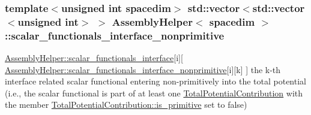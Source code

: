 \subsubsection[{\texorpdfstring{scalar\+\_\+functionals\+\_\+interface\+\_\+nonprimitive}{scalar_functionals_interface_nonprimitive}}]{\setlength{\rightskip}{0pt plus 5cm}template$<$unsigned int spacedim$>$ std\+::vector$<$std\+::vector$<$unsigned int$>$ $>$ {\bf Assembly\+Helper}$<$ spacedim $>$\+::scalar\+\_\+functionals\+\_\+interface\+\_\+nonprimitive\hspace{0.3cm}{\ttfamily [private]}}\hypertarget{class_assembly_helper_a833383aa6d157157545204143897ed9e}{}\label{class_assembly_helper_a833383aa6d157157545204143897ed9e}
\hyperlink{class_assembly_helper_a29aa77e0e8e6b35c94966ea88840e462}{Assembly\+Helper\+::scalar\+\_\+functionals\+\_\+interface}\mbox{[}{\ttfamily i}\mbox{]}\mbox{[} \hyperlink{class_assembly_helper_a833383aa6d157157545204143897ed9e}{Assembly\+Helper\+::scalar\+\_\+functionals\+\_\+interface\+\_\+nonprimitive}\mbox{[}{\ttfamily i}\mbox{]}\mbox{[}{\ttfamily k}\mbox{]} \mbox{]} the {\ttfamily k-\/th} interface related scalar functional entering non-\/primitively into the total potential (i.\+e., the scalar functional is part of at least one \hyperlink{class_total_potential_contribution}{Total\+Potential\+Contribution} with the member \hyperlink{class_total_potential_contribution_a45bfb25a7693c949c26e223cf4a1a1e7}{Total\+Potential\+Contribution\+::is\+\_\+primitive} set to {\ttfamily false}) 
